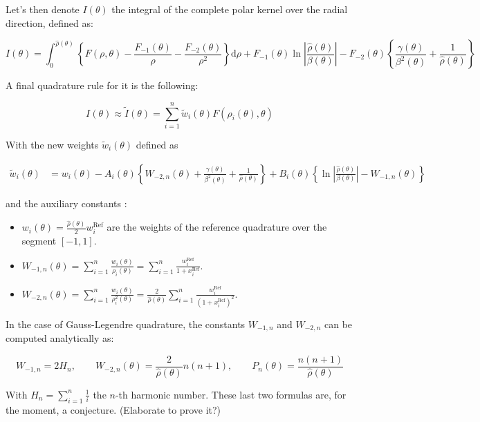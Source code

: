 ﻿\documentclass{article}
\begin{document}
Let's then denote $I(\theta)$ the integral of the complete polar kernel over the radial direction, defined as:

\begin{equation}
  I(\theta) = \int_{0}^{\hat{\rho}(\theta)} \left\{F(\rho, \theta) - \frac{F_{-1}(\theta)}{\rho} - \frac{F_{-2}(\theta)}{\rho^2}\right\}\mathrm d\rho + F_{-1}(\theta)\ln\left|\frac{\hat\rho(\theta)}{\beta(\theta)}\right| - F_{-2}(\theta)\left\{\frac{\gamma(\theta)}{\beta^2(\theta)}+\frac{1}{\hat\rho(\theta)}\right\}
\end{equation}

A final quadrature rule for it is the following:

\begin{equation}
  I(\theta) \approx \widetilde I(\theta) = \sum_{i=1}^{n} \widetilde w_i(\theta) F(\rho_i(\theta), \theta)
\end{equation}

With the new weights $\widetilde w_i(\theta)$ defined as

\begin{align*}
  \widetilde{w}_i(\theta) & = w_i(\theta) - A_i(\theta)\left\{W_{-2,n}(\theta) + \frac{\gamma(\theta)}{\beta^2(\theta)} + \frac{1}{\hat\rho(\theta)}\right\} + B_i(\theta)\left\{\ln\left|\frac{\hat\rho(\theta)}{\beta(\theta)}\right| - W_{-1,n}(\theta)\right\}
\end{align*}

and the auxiliary constants : 

\begin{itemize}
  \item $w_i(\theta) = \frac{\hat\rho(\theta)}{2}w_i^{\text{Ref}}$ are the weights of the reference quadrature over the segment $[-1, 1]$.
  \item $W_{-1,n}(\theta) = \sum_{i=1}^{n} \frac{w_i(\theta)}{\rho_i(\theta)} = \sum_{i=1}^{n} \frac{w_i^{\text{Ref}}}{1+x_i^{\text{Ref}}}$.
  \item $W_{-2,n}(\theta) = \sum_{i=1}^{n} \frac{w_i(\theta)}{\rho_i^2(\theta)} = \frac{2}{\hat\rho(\theta)}\sum_{i=1}^{n} \frac{w_i^{\text{Ref}}}{\left(1+x_i^{\text{Ref}}\right)^2}$.
\end{itemize}

\begin{remark} 
  In the case of Gauss-Legendre quadrature, the constants $W_{-1,n}$ and $W_{-2,n}$ can be computed analytically as:  

  \begin{equation}
    W_{-1,n} = 2H_n, \qquad W_{-2,n}(\theta) = \frac{2}{\hat\rho(\theta)}n(n+1), \qquad P_n(\theta) = \frac{n(n+1)}{\hat\rho(\theta)}
  \end{equation}

  With $H_n = \sum_{i=1}^{n} \frac{1}{i}$ the $n$-th harmonic number. These last two formulas are, for the moment, a conjecture. (Elaborate to prove it?)

\end{remark}
\end{document}
